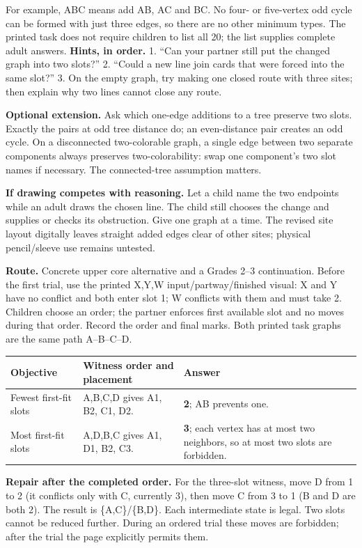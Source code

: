 \documentclass[10pt,letterpaper]{article}
\newcommand{\topic}[1]{\vspace{3pt}{\large\bfseries #1}\par}
\newcommand{\labelled}[2]{\textbf{#1} #2\par}
\newcommand{\hint}[1]{\textbf{Hints, in order.} #1\par}
\newcommand{\route}[1]{\textbf{Route.} #1\par}
\begin{document}
For example, ABC means add AB, AC and BC. No four- or five-vertex odd cycle can be formed with just three edges, so there are no other minimum types. The printed task does not require children to list all 20; the list supplies complete adult answers.
\hint{1. ``Can your partner still put the changed graph into two slots?'' 2. ``Could a new line join cards that were forced into the same slot?'' 3. On the empty graph, try making one closed route with three sites; then explain why two lines cannot close any route.}
\labelled{Optional extension.}{Ask which one-edge additions to a tree preserve two slots. Exactly the pairs at odd tree distance do; an even-distance pair creates an odd cycle. On a disconnected two-colorable graph, a single edge between two separate components always preserves two-colorability: swap one component's two slot names if necessary. The connected-tree assumption matters.}
\labelled{If drawing competes with reasoning.}{Let a child name the two endpoints while an adult draws the chosen line. The child still chooses the change and supplies or checks its obstruction. Give one graph at a time. The revised site layout digitally leaves straight added edges clear of other sites; physical pencil/sleeve use remains untested.}
\newpage
\topic{Student p. 7 / Problem 7: first-fit and repair}
\route{Concrete upper core alternative and a Grades 2--3 continuation. Before the first trial, use the printed X,Y,W input/partway/finished visual: X and Y have no conflict and both enter slot 1; W conflicts with them and must take 2. Children choose an order; the partner enforces first available slot and no moves during that order. Record the order and final marks. Both printed task graphs are the same path A--B--C--D.}
\begin{tabularx}{\linewidth}{@{}p{1.1in}Xp{1.4in}@{}}
\toprule
Objective & Witness order and placement & Answer \\
\midrule
Fewest first-fit slots & A,B,C,D gives A1, B2, C1, D2. & \textbf{2}; AB prevents one. \\
Most first-fit slots & A,D,B,C gives A1, D1, B2, C3. & \textbf{3}; each vertex has at most two neighbors, so at most two slots are forbidden. \\
\bottomrule
\end{tabularx}\par\smallskip
\labelled{Repair after the completed order.}{For the three-slot witness, move D from 1 to 2 (it conflicts only with C, currently 3), then move C from 3 to 1 (B and D are both 2). The result is \{A,C\}/\{B,D\}. Each intermediate state is legal. Two slots cannot be reduced further. During an ordered trial these moves are forbidden; after the trial the page explicitly permits them.}
\end{document}
